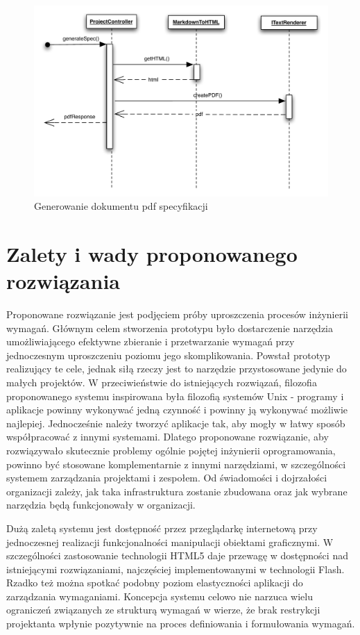       \begin{figure}[t]
        \centering
        \includegraphics[width=1.0\textwidth]{img/seq.pdf}
        \caption{Generowanie dokumentu pdf specyfikacji}
        \label{fig:seq}
      \end{figure}

      \newpage

  \section{Zalety i wady proponowanego rozwiązania}
    Proponowane rozwiązanie jest podjęciem próby uproszczenia procesów inżynierii wymagań. Głównym celem stworzenia prototypu było dostarczenie narzędzia umożliwiającego efektywne zbieranie i przetwarzanie wymagań przy jednoczesnym uproszczeniu poziomu jego skomplikowania. Powstał prototyp realizujący te cele, jednak siłą rzeczy jest to narzędzie przystosowane jedynie do małych projektów. W przeciwieństwie do istniejących rozwiązań, filozofia proponowanego systemu inspirowana była filozofią systemów Unix - programy i aplikacje powinny wykonywać jedną czynność i powinny ją wykonywać możliwie najlepiej. Jednocześnie należy tworzyć aplikacje tak, aby mogły w łatwy sposób współpracować z innymi systemami. Dlatego proponowane rozwiązanie, aby rozwiązywało skutecznie problemy ogólnie pojętej inżynierii oprogramowania, powinno być stosowane komplementarnie z innymi narzędziami, w szczególności systemem zarządzania projektami i zespołem. Od świadomości i dojrzałości organizacji zależy, jak taka infrastruktura zostanie zbudowana oraz jak wybrane narzędzia będą funkcjonowały w organizacji.

    Dużą zaletą systemu jest dostępność przez przeglądarkę internetową przy jednoczesnej realizacji funkcjonalności manipulacji obiektami graficznymi. W szczególności zastosowanie technologii HTML5 daje przewagę w dostępności nad istniejącymi rozwiązaniami, najczęściej implementowanymi w technologii Flash. Rzadko też można spotkać podobny poziom elastyczności aplikacji do zarządzania wymaganiami. Koncepcja systemu celowo nie narzuca wielu ograniczeń związanych ze strukturą wymagań w wierze, że brak restrykcji projektanta wpłynie pozytywnie na proces definiowania i formułowania wymagań. 

